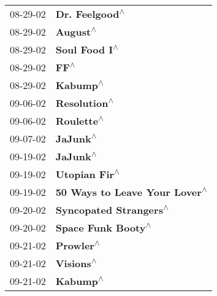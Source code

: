 \begin{supertabular}{p{0.25\columnwidth}p{0.75\columnwidth}}
 08-29-02 &                                                             \textbf{Dr. Feelgood\textsuperscript{$\wedge$}} \\
 08-29-02 &                                                                   \textbf{August\textsuperscript{$\wedge$}} \\
 08-29-02 &                                                              \textbf{Soul Food I\textsuperscript{$\wedge$}} \\
 08-29-02 &                                                                       \textbf{FF\textsuperscript{$\wedge$}} \\
 08-29-02 &                                                                   \textbf{Kabump\textsuperscript{$\wedge$}} \\
 09-06-02 &                                                               \textbf{Resolution\textsuperscript{$\wedge$}} \\
 09-06-02 &                                                                 \textbf{Roulette\textsuperscript{$\wedge$}} \\
 09-07-02 &                                                                   \textbf{JaJunk\textsuperscript{$\wedge$}} \\
 09-19-02 &                                                                   \textbf{JaJunk\textsuperscript{$\wedge$}} \\
 09-19-02 &                                                              \textbf{Utopian Fir\textsuperscript{$\wedge$}} \\
 09-19-02 &                                              \textbf{50 Ways to Leave Your Lover\textsuperscript{$\wedge$}} \\
 09-20-02 &                                                     \textbf{Syncopated Strangers\textsuperscript{$\wedge$}} \\
 09-20-02 &                                                         \textbf{Space Funk Booty\textsuperscript{$\wedge$}} \\
 09-21-02 &                                                                  \textbf{Prowler\textsuperscript{$\wedge$}} \\
 09-21-02 &                                                                  \textbf{Visions\textsuperscript{$\wedge$}} \\
 09-21-02 &                                                                   \textbf{Kabump\textsuperscript{$\wedge$}} \\

\end{supertabular}
